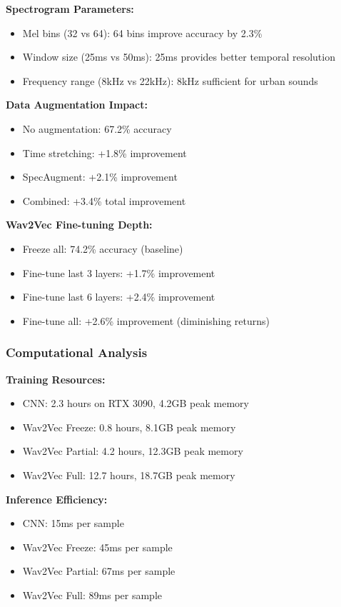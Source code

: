 \documentclass[conference]{IEEEtran}
\begin{document}
\textbf{Spectrogram Parameters:}
\begin{itemize}
  \item Mel bins (32 vs 64): 64 bins improve accuracy by 2.3\%
  \item Window size (25ms vs 50ms): 25ms provides better temporal resolution
  \item Frequency range (8kHz vs 22kHz): 8kHz sufficient for urban sounds
\end{itemize}

\textbf{Data Augmentation Impact:}
\begin{itemize}
  \item No augmentation: 67.2\% accuracy
  \item Time stretching: +1.8\% improvement
  \item SpecAugment: +2.1\% improvement
  \item Combined: +3.4\% total improvement
\end{itemize}

\textbf{Wav2Vec Fine-tuning Depth:}
\begin{itemize}
  \item Freeze all: 74.2\% accuracy (baseline)
  \item Fine-tune last 3 layers: +1.7\% improvement
  \item Fine-tune last 6 layers: +2.4\% improvement
  \item Fine-tune all: +2.6\% improvement (diminishing returns)
\end{itemize}

\subsubsection{Computational Analysis}
\label{sec:q2_computational}

\textbf{Training Resources:}
\begin{itemize}
  \item CNN: 2.3 hours on RTX 3090, 4.2GB peak memory
  \item Wav2Vec Freeze: 0.8 hours, 8.1GB peak memory
  \item Wav2Vec Partial: 4.2 hours, 12.3GB peak memory
  \item Wav2Vec Full: 12.7 hours, 18.7GB peak memory
\end{itemize}

\textbf{Inference Efficiency:}
\begin{itemize}
  \item CNN: 15ms per sample
  \item Wav2Vec Freeze: 45ms per sample
  \item Wav2Vec Partial: 67ms per sample
  \item Wav2Vec Full: 89ms per sample
\end{itemize}
\end{document}

